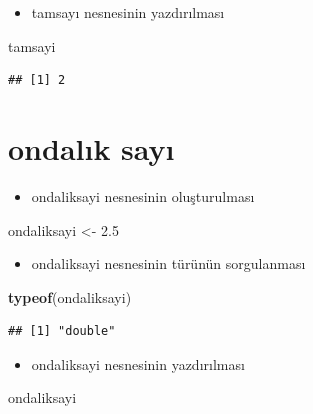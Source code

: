 \documentclass[
  oneside]{book}
\newenvironment{Shaded}{\begin{snugshade}}{\end{snugshade}}
\newcommand{\FloatTok}[1]{\textcolor[rgb]{0.00,0.00,0.81}{#1}}
\newcommand{\FunctionTok}[1]{\textcolor[rgb]{0.13,0.29,0.53}{\textbf{#1}}}
\newcommand{\NormalTok}[1]{#1}
\newcommand{\OtherTok}[1]{\textcolor[rgb]{0.56,0.35,0.01}{#1}}
\providecommand{\tightlist}{%
  \setlength{\itemsep}{0pt}\setlength{\parskip}{0pt}}
\begin{document}
\begin{itemize}
\tightlist
\item
  tamsayı nesnesinin yazdırılması
\end{itemize}

\begin{Shaded}
\begin{Highlighting}[]
\NormalTok{tamsayi}
\end{Highlighting}
\end{Shaded}

\begin{verbatim}
## [1] 2
\end{verbatim}

\hypertarget{ondalux131k-sayux131}{%
\section{ondalık sayı}\label{ondalux131k-sayux131}}

\begin{itemize}
\tightlist
\item
  ondaliksayi nesnesinin oluşturulması
\end{itemize}

\begin{Shaded}
\begin{Highlighting}[]
\NormalTok{ondaliksayi }\OtherTok{\textless{}{-}} \FloatTok{2.5}
\end{Highlighting}
\end{Shaded}

\begin{itemize}
\tightlist
\item
  ondaliksayi nesnesinin türünün sorgulanması
\end{itemize}

\begin{Shaded}
\begin{Highlighting}[]
\FunctionTok{typeof}\NormalTok{(ondaliksayi)}
\end{Highlighting}
\end{Shaded}

\begin{verbatim}
## [1] "double"
\end{verbatim}

\begin{itemize}
\tightlist
\item
  ondaliksayi nesnesinin yazdırılması
\end{itemize}

\begin{Shaded}
\begin{Highlighting}[]
\NormalTok{ondaliksayi}
\end{Highlighting}
\end{Shaded}
\end{document}
